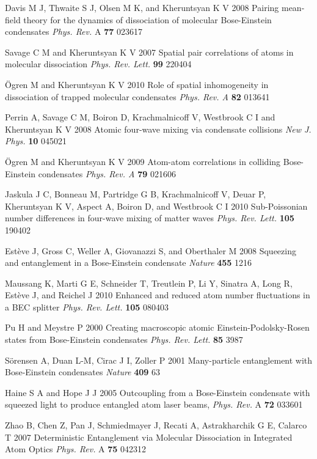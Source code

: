 \documentclass{iopart}
\begin{document}
\begin{thebibliography}{10}
 Davis M J, Thwaite S J, Olsen M K, and Kheruntsyan K V 2008 Pairing mean-field theory for the dynamics of dissociation of molecular Bose-Einstein condensates \emph{Phys. Rev.} A {\bf 77} 023617

 Savage C M and Kheruntsyan K V 2007 Spatial pair correlations of atoms in molecular dissociation \emph{Phys. Rev. Lett.} {\bf 99} 220404 

 {\"{O}}gren M and Kheruntsyan K V 2010 Role of spatial inhomogeneity in dissociation of trapped molecular condensates \emph{Phys. Rev. A} {\bf 82} 013641

 Perrin A, Savage C M, Boiron D, Krachmalnicoff V, Westbrook C I and Kheruntsyan K V 2008 Atomic four-wave mixing via condensate collisions \emph{New J. Phys.} {\bf 10} 045021

 {\"{O}}gren M and Kheruntsyan K V 2009 Atom-atom correlations in colliding Bose-Einstein condensates \emph{Phys. Rev. A} {\bf 79} 021606

 Jaskula J C, Bonneau M, Partridge G B, Krachmalnicoff V, Deuar P, Kheruntsyan K V, Aspect A, Boiron D, and Westbrook C I 2010 Sub-Poissonian number differences in four-wave mixing of matter waves \emph{Phys. Rev. Lett.} {\bf 105} 190402

 Est{\`{e}}ve J, Gross C, Weller A, Giovanazzi S, and Oberthaler M 2008 Squeezing and entanglement in a Bose-Einstein condensate \emph{Nature} {\bf 455} 1216

 Maussang K, Marti G E, Schneider T, Treutlein P, Li Y, Sinatra A, Long R, Est{\`{e}}ve J, and Reichel J 2010 Enhanced and reduced atom number fluctuations in a BEC splitter \emph{Phys. Rev. Lett.} {\bf 105} 080403

 Pu H and Meystre P 2000 Creating macroscopic atomic Einstein-Podolsky-Rosen states from Bose-Einstein condensates \emph{Phys. Rev. Lett.} {\bf 85} 3987

 S{\"{o}}rensen A, Duan L-M, Cirac J I, Zoller P 2001 Many-particle entanglement with Bose-Einstein condensates \emph{Nature} {\bf 409} 63

 Haine S A and Hope J J 2005 Outcoupling from a Bose-Einstein condensate with squeezed light to produce entangled atom laser beams, \emph{Phys. Rev.} A {\bf 72} 033601

 Zhao B, Chen Z, Pan J, Schmiedmayer J, Recati A, Astrakharchik G E, Calarco T 2007 Deterministic Entanglement via Molecular Dissociation in Integrated Atom Optics \emph{Phys. Rev.} A {\bf 75} 042312


\end{thebibliography}
\end{document}
